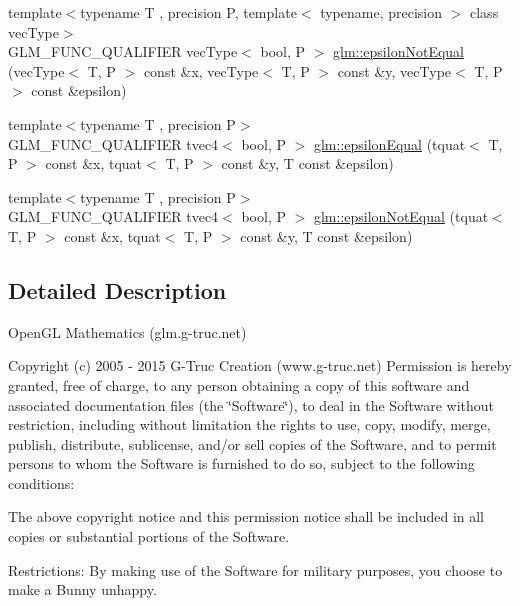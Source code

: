 \begin{DoxyCompactItemize}
\item 
{\footnotesize template$<$typename T , precision P, template$<$ typename, precision $>$ class vec\+Type$>$ }\\G\+L\+M\+\_\+\+F\+U\+N\+C\+\_\+\+Q\+U\+A\+L\+I\+F\+I\+E\+R vec\+Type$<$ bool, P $>$ \hyperlink{namespaceglm_a34387d61360bf88bcca96b797f53e49d}{glm\+::epsilon\+Not\+Equal} (vec\+Type$<$ T, P $>$ const \&x, vec\+Type$<$ T, P $>$ const \&y, vec\+Type$<$ T, P $>$ const \&epsilon)
\item 
{\footnotesize template$<$typename T , precision P$>$ }\\G\+L\+M\+\_\+\+F\+U\+N\+C\+\_\+\+Q\+U\+A\+L\+I\+F\+I\+E\+R tvec4$<$ bool, P $>$ \hyperlink{namespaceglm_a9573ceefb3bf8f199bd920f2a7ffa4cb}{glm\+::epsilon\+Equal} (tquat$<$ T, P $>$ const \&x, tquat$<$ T, P $>$ const \&y, T const \&epsilon)
\item 
{\footnotesize template$<$typename T , precision P$>$ }\\G\+L\+M\+\_\+\+F\+U\+N\+C\+\_\+\+Q\+U\+A\+L\+I\+F\+I\+E\+R tvec4$<$ bool, P $>$ \hyperlink{namespaceglm_a1fcc8ab0db03be6e6c6c375b170c1f79}{glm\+::epsilon\+Not\+Equal} (tquat$<$ T, P $>$ const \&x, tquat$<$ T, P $>$ const \&y, T const \&epsilon)
\end{DoxyCompactItemize}


\subsection{Detailed Description}
Open\+G\+L Mathematics (glm.\+g-\/truc.\+net)

Copyright (c) 2005 -\/ 2015 G-\/\+Truc Creation (www.\+g-\/truc.\+net) Permission is hereby granted, free of charge, to any person obtaining a copy of this software and associated documentation files (the \char`\"{}\+Software\char`\"{}), to deal in the Software without restriction, including without limitation the rights to use, copy, modify, merge, publish, distribute, sublicense, and/or sell copies of the Software, and to permit persons to whom the Software is furnished to do so, subject to the following conditions\+:

The above copyright notice and this permission notice shall be included in all copies or substantial portions of the Software.

Restrictions\+: By making use of the Software for military purposes, you choose to make a Bunny unhappy.


